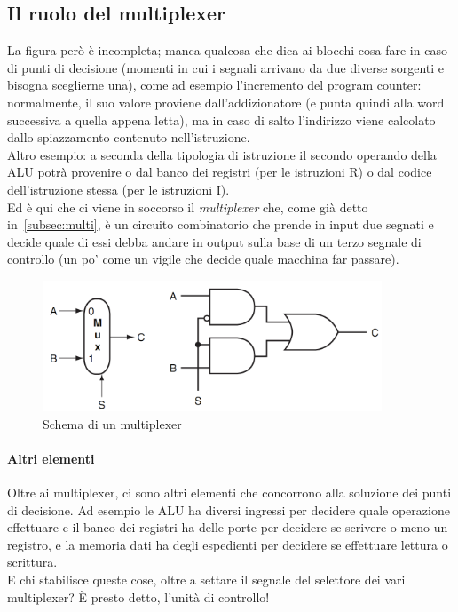 \documentclass[class=book, crop=false, oneside]{standalone}
\begin{document}
\subsection{Il ruolo del multiplexer}
La  figura però è incompleta; manca qualcosa che dica ai blocchi cosa fare in caso di punti di decisione (momenti in cui i segnali arrivano da due diverse sorgenti e bisogna sceglierne una), come ad esempio l'incremento del program counter: normalmente, il suo valore proviene dall'addizionatore (e punta quindi alla word successiva a quella appena letta), ma in caso di salto l'indirizzo viene calcolato dallo spiazzamento contenuto nell'istruzione.\\
Altro esempio: a seconda della tipologia di istruzione il secondo operando della ALU potrà provenire o dal banco dei registri (per le istruzioni R) o dal codice dell'istruzione stessa (per le istruzioni I).\\
Ed è qui che ci viene in soccorso il \emph{multiplexer} che, come già detto in~\ref{subsec:multi}, è un circuito combinatorio che prende in input due segnati e decide quale di essi debba andare in output sulla base di un terzo segnale di controllo (un po' come un vigile che decide quale macchina far passare).
\begin{figure}[H]
	\centering
	\includegraphics[width=0.9\textwidth,keepaspectratio]{multi}
	\caption{Schema di un multiplexer}
\end{figure}
\paragraph{Altri elementi}
Oltre ai multiplexer, ci sono altri elementi che concorrono alla soluzione dei punti di decisione. Ad esempio le ALU ha diversi ingressi per decidere quale operazione effettuare e il banco dei registri ha delle porte per decidere se scrivere o meno un registro, e la memoria dati ha degli espedienti per decidere se effettuare lettura o scrittura.\\
E chi stabilisce queste cose, oltre a settare il segnale del selettore dei vari multiplexer?  È presto detto, l’unità di controllo!\\
\end{document}

